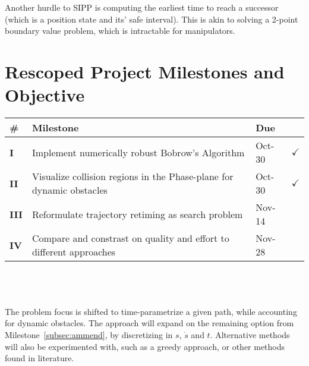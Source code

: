 \documentclass[letterpaper,11pt]{article} %
\begin{document}
Another hurdle to SIPP is computing the earliest time to reach a successor (which is a position state and its' safe interval). This is akin to solving a 2-point boundary value problem, which is intractable for manipulators.

\section*{Rescoped Project Milestones and Objective}

\begin{tabular}{|p{}|p{}|p{}|p{}|}
\hline
\textbf{\#} & \textbf{Milestone} & \textbf{Due} & \textbf{}\\
\hline

\textbf{I} & Implement numerically robust Bobrow's Algorithm & Oct-30 & $\checkmark$ \\
\hline

\textbf{II} & Visualize collision regions in the Phase-plane for dynamic obstacles & Oct-30 & $\checkmark$ \\
\hline

\textbf{III} & Reformulate trajectory retiming as search problem & Nov-14 & \\
\hline

\textbf{IV} & Compare and constrast on quality and effort to different approaches & Nov-28 & \\
\hline
\end{tabular}
\\
\\
\\
The problem focus is shifted to time-parametrize a given path, while accounting for dynamic obstacles. The approach will expand on the remaining option from Milestone~\ref{subsec:ammend}, by discretizing in $s$, $\dot{s}$ and $t$. Alternative methods will also be experimented with, such as a greedy approach, or other methods found in literature.







\end{document}
